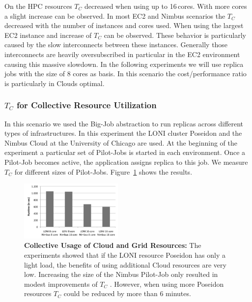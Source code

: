 \documentclass[conference,final]{IEEEtran}
\newcommand{\tc}{$T_{C}$ }
\begin{document}
On the HPC resources \tc decreased when using up to 16\,cores. With more cores a slight increase can
be observed. In most EC2 and Nimbus scenarios the \tc decreased with the number of instances and cores
used. When using the largest EC2 instance and increase of \tc can be observed. These behavior is particularly
caused by the slow interconnects between these instances. Generally those interconnects are heavily oversubscribed
in particular in the EC2 environment causing this massive slowdown. In the following experiments we 
will use replica jobs with the size of 8 cores as basis. In this scenario the cost/performance
ratio is particularly in Clouds optimal. 

\subsubsection{\tc for Collective Resource Utilization}

In this scenario we used the Big-Job abstraction to run replicas across different types of
infrastructures. In this experiment the LONI cluster Poseidon and the Nimbus Cloud at the University
of Chicago are used. At the beginning of the experiment a particular set of Pilot-Jobs is started
in each environment. Once a Pilot-Job becomes active, the application assigns replica to 
this job. We measure \tc for different sizes of Pilot-Jobs. Figure~\ref{fig:performance_8replica_scenario_poseidon_nimbus}
shows the results.

\begin{figure}[htbp]
    \centering
        \includegraphics[width=0.45\textwidth]{performance/8replica_scenario_poseidon_nimbus}
    \caption{\textbf{Collective Usage of Cloud and Grid Resources: }  The experiments showed that if the LONI resource
             Poseidon has only a light load, the benefits of using additional Cloud resources are very low. Increasing
             the size of the Nimbus Pilot-Job only resulted in modest improvements of \tc. 
             However, when using more Poseidon resources \tc could be reduced by more than 6 minutes.}
    \label{fig:performance_8replica_scenario_poseidon_nimbus}
\end{figure}
\end{document}
